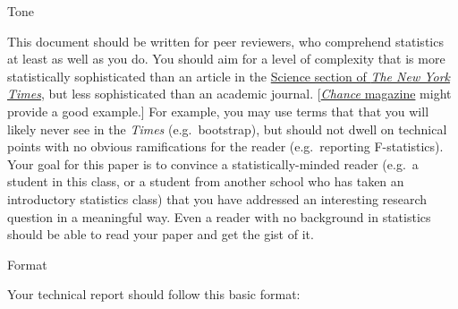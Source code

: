 \documentclass[]{article}
\begin{document}
Tone

This document should be written for peer reviewers, who comprehend
statistics at least as well as you do. You should aim for a level of
complexity that is more statistically sophisticated than an article in
the \href{http://www.nytimes.com/pages/science/}{Science section of
\emph{The New York Times}}, but less sophisticated than an academic
journal. {[}\href{http://chance.amstat.org/}{\emph{Chance} magazine}
might provide a good example.{]} For example, you may use terms that
that you will likely never see in the \emph{Times} (e.g.~bootstrap), but
should not dwell on technical points with no obvious ramifications for
the reader (e.g.~reporting F-statistics). Your goal for this paper is to
convince a statistically-minded reader (e.g.~a student in this class, or
a student from another school who has taken an introductory statistics
class) that you have addressed an interesting research question in a
meaningful way. Even a reader with no background in statistics should be
able to read your paper and get the gist of it.

Format

Your technical report should follow this basic format:
\end{document}
